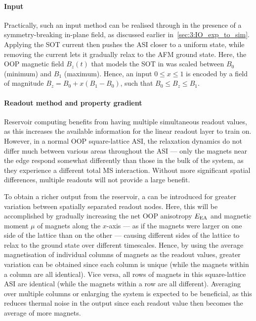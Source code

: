 \paragraph{Input}
Practically, such an input method can be realised through  in the presence of a symmetry-breaking in-plane field, as discussed earlier in~\cref{sec:3:IO_exp_to_sim}.
Applying the SOT current then pushes the ASI closer to a uniform state, while removing the current lets it gradually relax to the AFM ground state.
Here, the OOP magnetic field $B_z(t)$ that models the SOT in \hotspice was scaled between $B_0$ (minimum) and $B_1$ (maximum).
Hence, an input $0 \leq x \leq 1$ is encoded by a field of magnitude $B_z = B_0 + x (B_1 - B_0)$, such that $B_0 \leq B_z \leq B_1$.

\paragraph{Readout method and property gradient}
Reservoir computing benefits from having multiple simultaneous readout values, as this increases the available information for the linear readout layer to train on.
However, in a normal OOP square-lattice ASI, the relaxation dynamics do not differ much between various areas throughout the ASI --- only the magnets near the edge respond somewhat differently than those in the bulk of the system, as they experience a different total MS interaction.
Without more significant spatial differences, multiple readouts will not provide a large benefit. \\\par
To obtain a richer output from the reservoir, a  can be introduced for greater variation between spatially separated readout nodes. %
Here, this will be accomplished by gradually increasing the net OOP anisotropy $E_\mathrm{EA}$ and magnetic moment $\mu$ of magnets along the $x$-axis --- as if the magnets were larger on one side of the lattice than on the other --- causing different sides of the lattice to relax to the ground state over different timescales.
Hence, by using the average magnetisation of individual columns of magnets as the readout values, greater variation can be obtained since each column is unique (while the magnets within a column are all identical).
Vice versa, all rows of magnets in this square-lattice ASI are identical (while the magnets within a row are all different).
Averaging over multiple columns or enlarging the system is expected to be beneficial, as this reduces thermal noise in the output since each readout value then becomes the average of more magnets.

